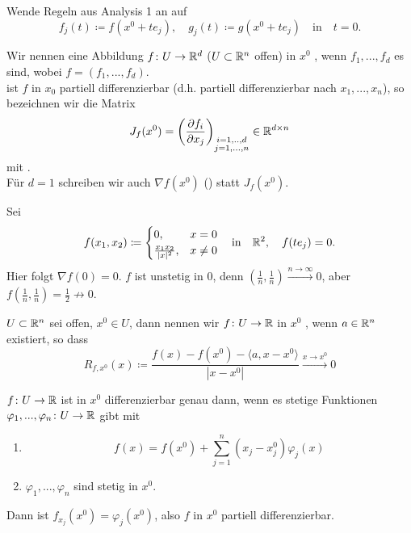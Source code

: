 \begin{beweis}
	Wende Regeln aus Analysis 1 an auf
	\[ f_j(t)\coloneqq f(x^0+te_j),\quad g_j(t)\coloneqq g(x^0+te_j)\quad\text{in}\quad t=0. \]
	\vspace{-22pt}
\end{beweis}
\newpage
\begin{definition}
	Wir nennen eine Abbildung $ f\colon U\rightarrow\mathbb{R}^d $ ($ U\subset \mathbb{R}^n $ offen) in $ x^0 $ , wenn $ f_1,...,f_d $ es sind, wobei $ f=(f_1,...,f_d) $.\\
	ist $ f $ in $ x_0 $ partiell differenzierbar (d.h. partiell differenzierbar nach $ x_1,...,x_n $), so bezeichnen wir die Matrix
	\[ J_f(x^0)=\left(\frac{\partial f_i}{\partial x_j}\right)_{\substack{i=1,..,d\\j=1,...,n}}\in\mathbb{R}^{d\times n} \]
	mit .\\
	F\"ur $ d=1 $ schreiben wir auch $ \nabla f(x^0) $ () statt $ J_f(x^0) $.
\end{definition}
\begin{beispiel*}
	Sei
	\[ f(x_1,x_2)\coloneqq \begin{cases}
	0,&x=0\\\frac{x_1x_2}{|x|^2},&x\neq 0
	\end{cases}\quad\text{in} \quad\mathbb{R}^2,\quad f(te_j)=0. \]
	Hier folgt $ \nabla f(0)=0 $. $ f $ ist unstetig in $ 0 $, denn $ \left(\frac{1}{n},\frac{1}{n}\right)\xrightarrow{n\to\infty}0 $, aber $ f\left(\frac{1}{n},\frac{1}{n}\right)=\frac{1}{2}\not\rightarrow 0 $.
\end{beispiel*}
\begin{definition}[Differenzierbarkeit]
	$ U\subset\mathbb{R}^n $ sei offen, $ x^0\in U $, dann nennen wir $ f\colon U\rightarrow\mathbb{R} $ in $ x^0 $ , wenn $ a\in\mathbb{R}^n $ existiert, so dass
	\[ R_{f,x^0}(x)\coloneqq\frac{f(x)-f(x^0)-\langle a,x-x^0\rangle}{|x-x^0|}\xrightarrow{x\to x^0}0 \]
\end{definition}
\begin{lemma}
	$ f\colon U\rightarrow\mathbb{R} $ ist in $ x^0 $ differenzierbar genau dann, wenn es stetige Funktionen $ \varphi_1,...,\varphi_n\colon U\rightarrow\mathbb{R} $ gibt mit
	\begin{enumerate}
		\item \[ f(x)=f(x^0)+\sum_{j=1}^n (x_j-x_j^0)\varphi_j(x) \]
		\item $ \varphi_1,...,\varphi_n $ sind stetig in $ x^0 $.
	\end{enumerate}
	Dann ist $ f_{x_j}(x^0)=\varphi_j(x^0) $, also $ f $ in $ x^0 $ partiell differenzierbar.
\end{lemma}
